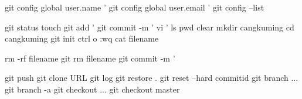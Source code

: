 git config global user.name '%
git config global user.email '%
git config --list %

git status
touch %
git add '%
git commit -m '%
vi '%
ls %
pwd %
clear
mkdir cangkuming  %
cd cangkuming %
git init %
ctrl o %
:wq   %
cat filename %

rm -rf filename
git rm filename
git commit -m '%

git push %
git clone URL
git log %
git restore . %
git reset --hard commitid %
git branch ... %
git branch -a %
git checkout ...%
git checkout master %